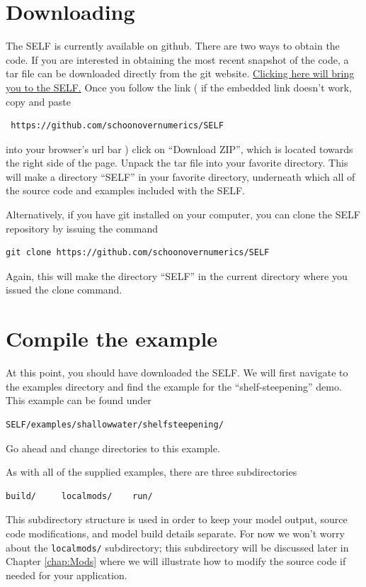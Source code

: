 \documentclass{softwaremanual}
\begin{document}
\section{Downloading}
The SELF is currently available on github. There are two ways to obtain the code. If you are interested in obtaining the most recent snapshot of the code, a tar file can be downloaded directly from the git website.  \href{https://github.com/schoonovernumerics/SELF}{Clicking here will bring you to the SELF.} Once you follow the link ( if the embedded link doesn't work, copy and paste
\begin{verbatim}
 https://github.com/schoonovernumerics/SELF 
\end{verbatim}
into your browser's url bar ) click on ``Download ZIP'', which is located towards the right side of the page. Unpack the tar file into your favorite directory. This will make a directory ``SELF'' in your favorite directory, underneath which all of the source code and examples included with the SELF. 

Alternatively, if you have git installed on your computer, you can clone the SELF repository by issuing the command
\begin{center}
\begin{verbatim}
git clone https://github.com/schoonovernumerics/SELF
\end{verbatim}
\end{center}
Again, this will make the directory ``SELF'' in the current directory where you issued the clone command. 

\section{Compile the example}
At this point, you should have downloaded the SELF. We will first navigate to the examples directory and find the example for the ``shelf-steepening'' demo. This example can be found under
\begin{center}
\begin{verbatim}
SELF/examples/shallowwater/shelfsteepening/
\end{verbatim}
\end{center}
Go ahead and change directories to this example.

As with all of the supplied examples, there are three subdirectories
\begin{center}
\begin{verbatim}
build/     localmods/    run/
\end{verbatim}
\end{center}
This subdirectory structure is used in order to keep your model output, source code modifications, and model build details separate. For now we won't worry about the \texttt{localmods/} subdirectory; this subdirectory will be discussed later in Chapter \ref{chap:Mods} where we will illustrate how to modify the source code if needed for your application.
\end{document}
